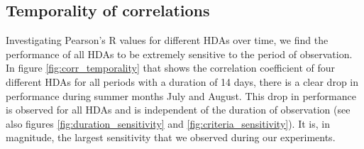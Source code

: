\documentclass[a4paper]{article}
\begin{document}
\subsection{Temporality of correlations}

Investigating Pearson's R values for different HDAs over time, we find the performance of all HDAs to be extremely sensitive to the period of observation. In figure \ref{fig:corr_temporality} that shows the correlation coefficient of four different HDAs for all periods with a duration of 14 days, there is a clear drop in performance during summer months July and August. This drop in performance is observed for all HDAs and is independent of the duration of observation (see also figures \ref{fig:duration_sensitivity} and \ref{fig:criteria_sensitivity}). It is, in magnitude, the largest sensitivity that we observed during our experiments.  
\end{document}
